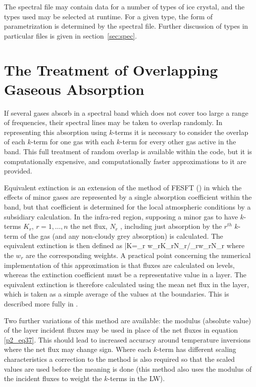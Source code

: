 The spectral file may contain data for a number of types of ice crystal,
and the types used may be selected at runtime. For a given type,
the form of parametrization is determined by the spectral file. Further
discussion of types in particular files is given in section~\ref{sec:spec}. 


\section{The Treatment of Overlapping Gaseous Absorption}

If several gases absorb in a spectral band which does not cover too 
large a range of frequencies, 
their spectral lines may be taken to overlap randomly. In representing 
this absorption using $k$-terms 
it is necessary to consider the overlap of each $k$-term for one gas 
with each $k$-term for every 
other gas active in the band. This full treatment of random overlap is 
available within the code, 
but it is computationally expensive, and computationally faster 
approximations to it are provided.

\noindent
Equivalent extinction is an extension of the method of FESFT 
(\cite{Ritter92}) in which the effects of 
minor gases are represented 
by a single absorption coefficient within the band, but that 
coefficient is determined for the local 
atmospheric conditions by a  subsidiary calculation. In the infra-red 
region, supposing a minor gas 
to have $k$-terms $K_{r}$, $r=1, \dots,n$ the net flux, $N_{r}$  , 
including just absorption by 
the $r^{th}$ $k$-term of the gas (and any non-cloudy  grey 
absorption) is calculated. The equivalent 
extinction is then defined as
\beq
\bar{K}=\sum_{r} w_{r}K_{r}N_{r}/\sum_{r}w_{r}N_{r}
\label{p2_eq37}
\eeq
where the $w_{r}$ are the corresponding weights. A practical point 
concerning the numerical 
implementation of this approximation is that fluxes are calculated on 
levels, whereas the extinction 
coefficient must be a representative value in a layer. The equivalent 
extinction is therefore 
calculated using the mean net flux in the layer, which is taken as a 
simple average of the values 
at the boundaries. This is described more fully in \cite{Edwards96ek}.

\noindent
Two further variations of this method are available: the modulus
(absolute value) of the layer incident fluxes may be used in place of the
net fluxes in equation \ref{p2_eq37}. This should lead to increased
accuracy around temperature inversions where the net flux may change sign.
Where each $k$-term has different scaling characteristics a correction to
the method is also required so that the scaled values are used before
the meaning is done (this method also uses the modulus of the incident
fluxes to weight the $k$-terms in the LW).

